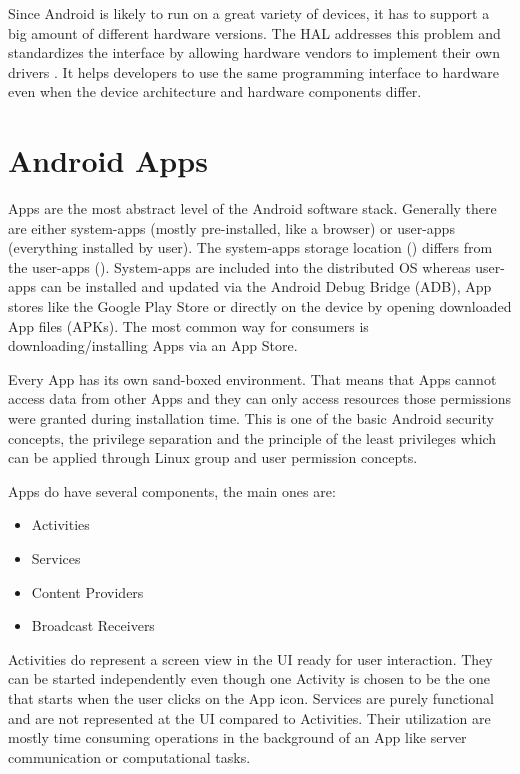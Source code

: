 Since Android is likely to run on a great variety of devices,
it has to support a big amount of different hardware versions.
The HAL addresses this problem and
standardizes the interface by allowing hardware vendors
to implement their own drivers \parencite[p.18f]{levin}. It helps
developers to use the same programming interface to hardware even when the
device architecture and hardware components differ.

\section{Android Apps}\label{section:android_apps}
Apps are the most abstract level of the Android software stack.
Generally there are either system-apps (mostly pre-installed, like a browser)
or user-apps (everything installed by user).
The system-apps storage location () differs from
the user-apps (). System-apps are included into the
distributed OS whereas user-apps can be installed and updated
via the Android Debug Bridge (ADB), App stores
like the Google Play Store or directly on the device by opening
downloaded App files (APKs). The most common way for consumers is
downloading/installing Apps via an App Store.

Every App has its own sand-boxed environment. That means that
Apps cannot access data from other Apps and they can only access
resources those permissions were granted during installation time.
This is one of the basic Android security concepts,
the privilege separation and the principle of the least
privileges \parencite[ch.1]{securityinternals} which can be applied through
Linux group and user permission concepts.

Apps do have several components, the main ones are:

\begin{itemize}
\item Activities
\item Services
\item Content Providers
\item Broadcast Receivers
\end{itemize}

Activities do represent a screen view in the UI ready for user
interaction. They can be started independently even though one Activity
is chosen to be the one that starts when the user clicks on the
App icon. Services are purely functional and are not represented
at the UI compared to Activities. Their utilization are mostly time
consuming operations in the background of an App like server
communication or computational tasks.


